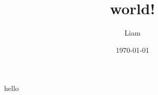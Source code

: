 \documentclass[UTF8]{ctexart}
\title{world!}
\author{Liam}
\date{\today}
\begin{document}
\maketitle
hello
\end{document}
